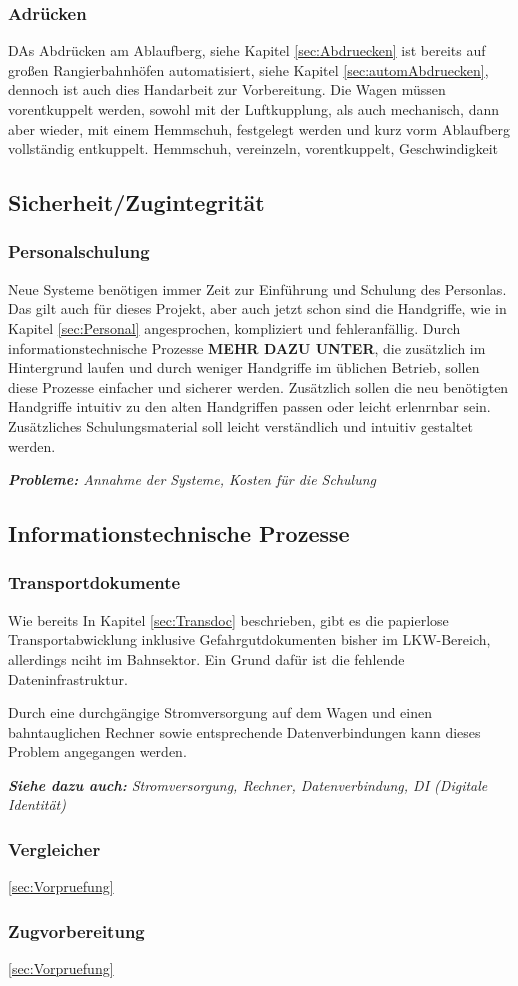 \subsubsection{Adrücken}
DAs Abdrücken am Ablaufberg, siehe Kapitel \ref{sec:Abdruecken} ist bereits auf großen Rangierbahnhöfen automatisiert, siehe Kapitel \ref{sec:automAbdruecken}, dennoch ist auch dies Handarbeit zur Vorbereitung. Die Wagen müssen vorentkuppelt werden, sowohl mit der Luftkupplung, als auch mechanisch, dann aber wieder, mit einem Hemmschuh, festgelegt werden und kurz vorm Ablaufberg vollständig entkuppelt. 
Hemmschuh, vereinzeln, vorentkuppelt, Geschwindigkeit
\subsection{Sicherheit/Zugintegrität}
\subsubsection{Personalschulung}
Neue Systeme benötigen immer Zeit zur Einführung und Schulung des Personlas. Das gilt auch für dieses Projekt, aber auch jetzt schon sind die Handgriffe, wie in Kapitel \ref{sec:Personal} angesprochen, kompliziert und fehleranfällig. Durch informationstechnische Prozesse \textbf{MEHR DAZU UNTER}, die zusätzlich im Hintergrund laufen und durch weniger Handgriffe im üblichen Betrieb, sollen diese Prozesse einfacher und sicherer werden. Zusätzlich sollen die neu benötigten Handgriffe intuitiv zu den alten Handgriffen passen oder leicht erlenrnbar sein. Zusätzliches Schulungsmaterial soll leicht verständlich und intuitiv gestaltet werden.\par
\textit{\textbf{Probleme:} Annahme der Systeme, Kosten für die Schulung}

\subsection{Informationstechnische Prozesse}
\subsubsection{Transportdokumente}
Wie bereits In Kapitel \ref{sec:Transdoc} beschrieben, gibt es die papierlose Transportabwicklung inklusive Gefahrgutdokumenten bisher im LKW-Bereich, allerdings nciht im Bahnsektor. Ein Grund dafür ist die fehlende Dateninfrastruktur.\par
Durch eine durchgängige Stromversorgung auf dem Wagen und einen bahntauglichen Rechner sowie entsprechende Datenverbindungen kann dieses Problem angegangen werden.\par
\textit{\textbf{Siehe dazu auch:} Stromversorgung, Rechner, Datenverbindung, DI (Digitale Identität)}
\subsubsection{Vergleicher}
\ref{sec:Vorpruefung}
\subsubsection{Zugvorbereitung}
\ref{sec:Vorpruefung}